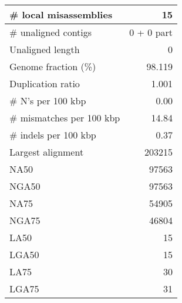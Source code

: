 \documentclass[12pt,a4paper]{article}
\begin{document}
\begin{table}[ht]
\begin{center}
\begin{tabular}{|l*{1}{|r}|}
\# local misassemblies & 15 \\ \hline
\# unaligned contigs & 0 + 0 part \\ \hline
Unaligned length & 0 \\ \hline
Genome fraction (\%) & 98.119 \\ \hline
Duplication ratio & 1.001 \\ \hline
\# N's per 100 kbp & 0.00 \\ \hline
\# mismatches per 100 kbp & 14.84 \\ \hline
\# indels per 100 kbp & 0.37 \\ \hline
Largest alignment & 203215 \\ \hline
NA50 & 97563 \\ \hline
NGA50 & 97563 \\ \hline
NA75 & 54905 \\ \hline
NGA75 & 46804 \\ \hline
LA50 & 15 \\ \hline
LGA50 & 15 \\ \hline
LA75 & 30 \\ \hline
LGA75 & 31 \\ \hline
\end{tabular}
\end{center}
\end{table}
\end{document}
